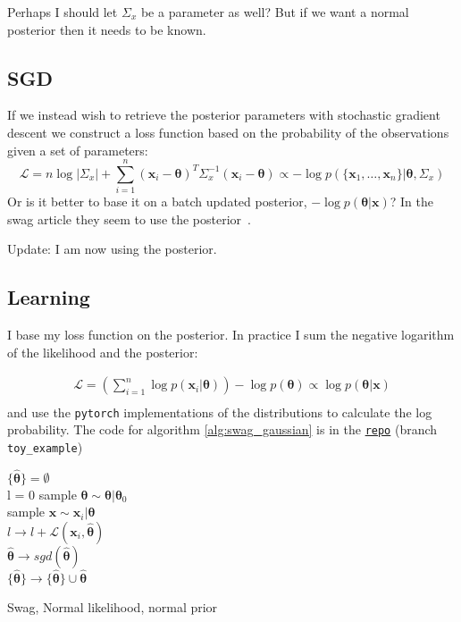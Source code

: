 Perhaps I should let $\Sigma_x$ be a parameter as well? But if we want a normal posterior then it needs to be known.

\subsection{SGD}

If we instead wish to retrieve the posterior parameters with stochastic gradient descent we construct a loss function based on the probability of the observations given a set of parameters:
\begin{equation}
  \mathcal{L} = n \log |\Sigma_x| + \displaystyle{\sum_{i=1}^n} (\bm{x}_i - \bm{\theta})^T \Sigma_x^{-1} (\bm{x}_i - \bm{\theta}) \propto - \log p(\{\bm{x}_1, \dots, \bm{x}_n\}| \bm{\theta}, \Sigma_x)
\end{equation}
Or is it better to base it on a batch updated posterior, $-\log p(\bm{\theta}| \bm{x})$? In the swag article they seem to use the posterior~\cite{swag}.

Update: I am now using the posterior.

\subsection{Learning}

I base my loss function on the posterior. In practice I sum the negative logarithm of the likelihood and the posterior:

\begin{align}
  \mathcal{L} = \left( \displaystyle{\sum_{i=1}^n} \log p( \bm{x}_i | \bm{\theta} ) \right) - \log p( \bm{\theta} ) \propto \log p( \bm{\theta} | \bm{x} )  \nonumber \\ 
\end{align}
and use the \texttt{pytorch} implementations of the distributions to calculate the log probability. The code for algorithm \ref{alg:swag_gaussian} is in the
\href{https://github.com/probabilisticdeeplearning/swa_gaussian/tree/toy_example}{\texttt{repo}} (branch \texttt{toy\_example})

\begin{algorithm}

  \Output{$\{\bm{\hat{\theta}}\}$}
  $\{\bm{\hat{\theta}}\} = \emptyset$\\
  {
    {
      l = 0
      {
        sample $\bm{\theta} \sim \bm{\theta} | \bm{\theta}_0$\\
        sample $\bm{x} \sim \bm{x}_i | \bm{\theta}$\\
        $l \to l + \mathcal{L}(\bm{x}_i, \bm{\hat{\theta}})$\\
      }
      $\bm{\hat{\theta}} \to sgd(\bm{\hat{\theta}})$\\
      $\{\bm{\hat{\theta}}\} \to \{\bm{\hat{\theta}}\} \cup \bm{\hat{\theta}}$
    }
  }
  \caption{Swag, Normal likelihood, normal prior}\label{alg:swag_gaussian}
\end{algorithm}


